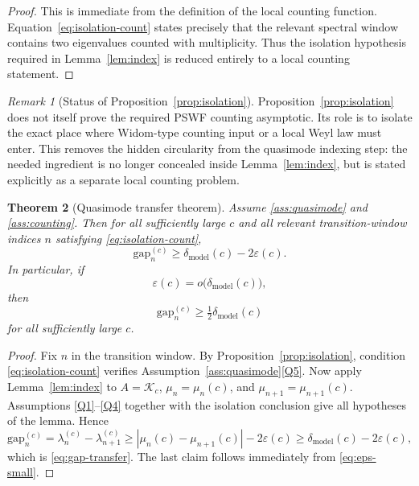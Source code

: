\documentclass[12pt,a4paper]{amsart}
\newtheorem{theorem}{Theorem}[section]
\theoremstyle{definition}
\theoremstyle{remark}
\newtheorem{remark}[theorem]{Remark}
\newcommand{\Kc}{\mathcal{K}_c}
\newcommand{\lambdac}[2]{\lambda_{#2}^{(#1)}}
\newcommand{\gapc}[2]{\mathrm{gap}_{#2}^{(#1)}}
\begin{document}
\begin{proof}
This is immediate from the definition of the local counting function.
Equation~\eqref{eq:isolation-count} states precisely that the relevant
spectral window contains two eigenvalues counted with multiplicity.
Thus the isolation hypothesis required in Lemma~\ref{lem:index} is reduced
entirely to a local counting statement.
\end{proof}

\begin{remark}[Status of Proposition~\ref{prop:isolation}]
Proposition~\ref{prop:isolation} does not itself prove the required PSWF
counting asymptotic.
Its role is to isolate the exact place where Widom-type counting input or a
local Weyl law must enter.
This removes the hidden circularity from the quasimode indexing step: the
needed ingredient is no longer concealed inside Lemma~\ref{lem:index}, but
is stated explicitly as a separate local counting problem.
\end{remark}

\begin{theorem}[Quasimode transfer theorem]
\label{thm:B}
Assume \ref{ass:quasimode} and \ref{ass:counting}.
Then for all sufficiently large $c$ and all relevant transition-window
indices $n$ satisfying \eqref{eq:isolation-count},
\begin{equation}\label{eq:gap-transfer}
  \gapc{c}{n} \ge \delta_{\mathrm{model}}(c) - 2\varepsilon(c).
\end{equation}
In particular, if
\begin{equation}\label{eq:eps-small}
  \varepsilon(c) = o\bigl(\delta_{\mathrm{model}}(c)\bigr),
\end{equation}
then
\begin{equation}\label{eq:gap-model-scale}
  \gapc{c}{n} \ge \tfrac12\delta_{\mathrm{model}}(c)
\end{equation}
for all sufficiently large $c$.
\end{theorem}

\begin{proof}
Fix $n$ in the transition window.
By Proposition~\ref{prop:isolation}, condition \eqref{eq:isolation-count}
verifies Assumption~\ref{ass:quasimode}\ref{Q5}.
Now apply Lemma~\ref{lem:index} to
$A=\Kc$, $\mu_n=\mu_n(c)$, and $\mu_{n+1}=\mu_{n+1}(c)$.
Assumptions \ref{Q1}--\ref{Q4} together with the isolation conclusion give
all hypotheses of the lemma.
Hence
\[
  \gapc{c}{n}
  = \lambdac{c}{n}-\lambdac{c}{n+1}
  \ge |\mu_n(c)-\mu_{n+1}(c)| - 2\varepsilon(c)
  \ge \delta_{\mathrm{model}}(c)-2\varepsilon(c),
\]
which is \eqref{eq:gap-transfer}.
The last claim follows immediately from \eqref{eq:eps-small}.
\end{proof}
\end{document}
